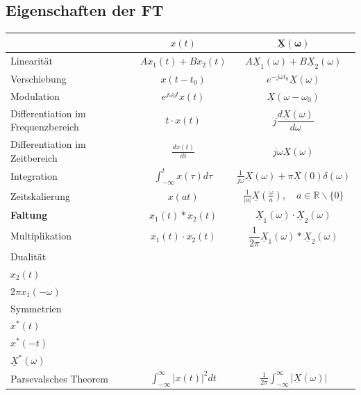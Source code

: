 \subsection{Eigenschaften der FT}
\begin{tabularx}{1.03\columnwidth}{|X|c|c|}
	\hline & $x(t)$ & $\mathbf{\underline{X}(\omega)}$ \\
	\hline Linearität & $A x_{1}(t)+B x_{2}(t)$ & $A \underline{X}_{1}(\omega)+B \underline{X}_{2}(\omega)$ \\
	\hline  Verschiebung & $x(t-t_0)$ & $e^{-j \omega t_0} \underline{X}(\omega)$ \\
	\hline Modulation & $e^{j \omega_{0} t} x(t)$ & $\underline{X}\left(\omega-\omega_{0}\right)$ \\
	\hline 
		\small Differentiation im Frequenzbereich
	 & $t \cdot x(t)$ & $j \dfrac{d \underline{X}(\omega)}{d \omega}$ \\
	\hline 
		\small Differentiation
		im Zeitbereich & $\frac{d x(t)}{d t}$ & $j \omega \underline{X}(\omega)$ \\
	\hline Integration & $\int_{-\infty}^{t} x(\tau) d \tau$ & $\frac{1}{j \omega} \underline{X}(\omega)+\pi \underline{X}(0) \delta(\omega)$ \\
	\hline Zeitskalierung & $x(a t)$ & $\frac{1}{|a|} \underline{X}\left(\frac{\omega}{a}\right), \quad a \in \mathbb{R} \backslash\{0\}$ \\
	\hline \textbf{Faltung} & $x_{1}(t) * x_{2}(t)$ & $\underline{X}_{1}(\omega) \cdot \underline{X}_{2}(\omega)$ \\
	\hline Multiplikation & $x_{1}(t) \cdot x_{2}(t)$ & $\dfrac{1}{2 \pi} \underline{X}_{1}(\omega) * \underline{X}_{2}(\omega)$ \\
	\hline Dualität & \begin{tabular}{l}
		$x_{1}(t)$ \\
		$x_{2}(t)$
	\end{tabular} & \begin{tabular}{l}
		$x_{2}(\omega)$ \\
		$2 \pi x_{1}(-\omega)$
	\end{tabular} \\
	\hline Symmetrien & \begin{tabular}{c}
		$x(-t)$ \\
		$x^{*}(t)$ \\
		$x^{*}(-t)$
	\end{tabular} & \begin{tabular}{c}
		$\dfrac{X}{X^{*}}(-\omega)$ \\
		$\underline{X}^{*}(\omega)$
	\end{tabular} \\
	\hline Parsevalsches Theorem & $\int_{-\infty}^{\infty}|x(t)|^{2} d t$ & $\frac{1}{2 \pi} \int_{-\infty}^{\infty} \left|\underline{X}(\omega) \right| $\\
	\hline	
\end{tabularx}



